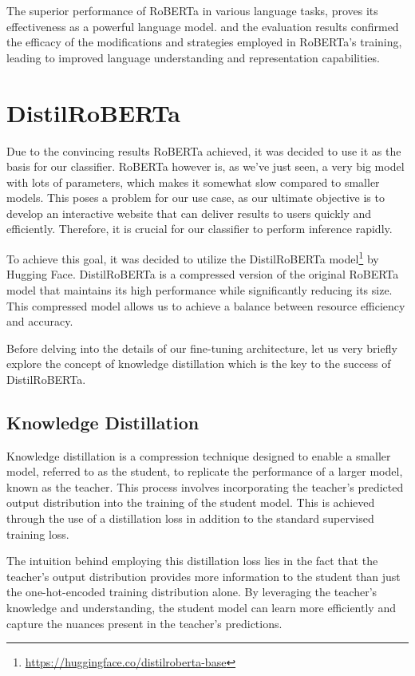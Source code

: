 \documentclass[12pt,oneside,bibtotoc,liststotoc]{scrbook}
\begin{document}
The superior performance of RoBERTa in various language tasks, proves its effectiveness as a powerful language model. and the evaluation results confirmed the efficacy of the modifications and strategies employed in RoBERTa's training, leading to improved language understanding and representation capabilities. \cite{roberta}

\section{DistilRoBERTa}
Due to the convincing results RoBERTa achieved, it was decided to use it as the basis for our classifier. RoBERTa however is, as we've just seen, a very big model with lots of parameters, which makes it somewhat slow compared to smaller models. This poses a problem for our use case, as our ultimate objective is to develop an interactive website that can deliver results to users quickly and efficiently. Therefore, it is crucial for our classifier to perform inference rapidly.

To achieve this goal, it was decided to utilize the DistilRoBERTa model\footnote{\url{https://huggingface.co/distilroberta-base}} by Hugging Face. DistilRoBERTa is a compressed version of the original RoBERTa model that maintains its high performance while significantly reducing its size. This compressed model allows us to achieve a balance between resource efficiency and accuracy.

Before delving into the details of our fine-tuning architecture, let us very briefly explore the concept of knowledge distillation which is the key to the success of DistilRoBERTa. \cite{distilbert}

\subsection{Knowledge Distillation}
Knowledge distillation is a compression technique designed to enable a smaller model, referred to as the student, to replicate the performance of a larger model, known as the teacher. This process involves incorporating the teacher's predicted output distribution into the training of the student model. This is achieved through the use of a distillation loss in addition to the standard supervised training loss.

The intuition behind employing this distillation loss lies in the fact that the teacher's output distribution provides more information to the student than just the one-hot-encoded training distribution alone. By leveraging the teacher's knowledge and understanding, the student model can learn more efficiently and capture the nuances present in the teacher's predictions. \cite{BucilDistil} \cite{HintonDistilling}
\end{document}
